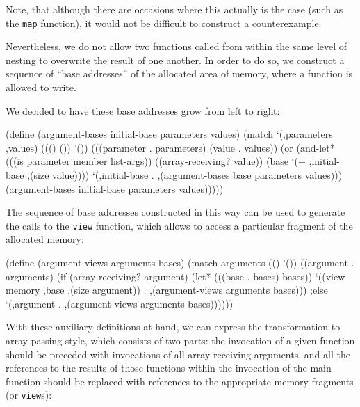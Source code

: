 Note, that although there are occasions where this actually is the case
(such as the \texttt{map} function), it would not be difficult to construct
a counterexample.

Nevertheless, we do not allow two functions called from
within the same level of nesting to overwrite the result of one another.
In order to do so, we construct a sequence of ``base addresses'' of
the allocated area of memory, where a function is allowed to write.

We decided to have these base addresses grow from left to right:

\begin{Snippet}
	   (define (argument-bases initial-base parameters values)
	     (match `(,parameters ,values)
	       ((() ())
		'())
	       (((parameter . parameters) (value . values))
		(or (and-let* (((is parameter member list-args))
			       ((array-receiving? value))
		               (base `(+ ,initial-base
                                         ,(size value))))
		      `(,initial-base . ,(argument-bases
                                          base
                                          parameters
					  values)))
		    (argument-bases initial-base
                                    parameters
                                    values)))))
\end{Snippet}

The sequence of base addresses constructed in this way can be used
to generate the calls to the \texttt{view} function, which allows
to access a particular fragment of the allocated memory:

\begin{Snippet}
	   (define (argument-views arguments bases)
	     (match arguments
	       (()
		'())
	       ((argument . arguments)
		(if (array-receiving? argument)
		    (let* (((base . bases) bases))
		      `((view memory ,base ,(size argument))
			. ,(argument-views arguments bases)))
                ;else
		    `(,argument . ,(argument-views
                                      arguments bases))))))
\end{Snippet}

With these auxiliary definitions at hand, we can express the
transformation to array passing style, which consists of two
parts: the invocation of a given function should be preceded
with invocations of all array-receiving arguments, and
all the references to the results of those functions within
the invocation of the main function should be replaced
with references to the appropriate memory fragments
(or \texttt{view}s):

